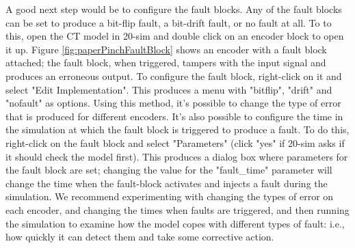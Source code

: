A good next step would be to configure the fault blocks.  Any of the
fault blocks can be set to produce a bit-flip fault, a bit-drift
fault, or no fault at all.  To to this, open the CT model in 20-sim
and double click on an encoder block to open it up.  Figure
\ref{fig:paperPinchFaultBlock} shows an encoder with a fault block
attached; the fault block, when triggered, tampers with the input
signal and produces an erroneous output.  To configure the fault
block, right-click on it and select "Edit Implementation".  This
produces a menu with "bitflip", "drift" and "nofault" as options.
Using this method, it's possible to change the type of error that is
produced for different encoders.  It's also possible to configure the
time in the simulation at which the fault block is triggered to
produce a fault.  To do this, right-click on the fault block and
select "Parameters" (click "yes" if 20-sim asks if it should check the
model first).  This produces a dialog box where parameters for the
fault block are set; changing the value for the "fault\_time"
parameter will change the time when the fault-block activates and
injects a fault during the simulation.  We recommend experimenting
with changing the types of error on each encoder, and changing the
times when faults are triggered, and then running the simulation to
examine how the model copes with different types of fault: i.e., how
quickly it can detect them and take some corrective action.



